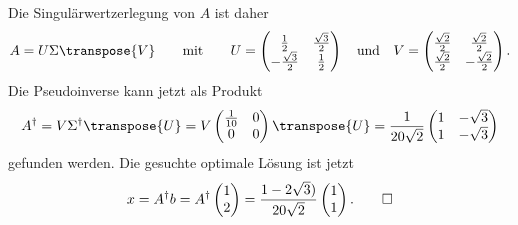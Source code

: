 \begin{loesung}
Die Singulärwertzerlegung von $A$ ist daher
\[
A
=
U\Sigma \transpose{V}
\qquad\text{mit}\qquad
U
=
\begin{pmatrix}
\frac{1}{2}         & \frac{\sqrt{3}}{2} \\
-\frac{\sqrt{3}}{2} & \frac{1}{2}       
\end{pmatrix}
\quad \text{und}\quad
V
=
\begin{pmatrix}
\frac{\sqrt{2}}2 & \frac{\sqrt{2}}2 \\
\frac{\sqrt{2}}2 &-\frac{\sqrt{2}}2
\end{pmatrix}.
\]
Die Pseudoinverse kann jetzt als Produkt
\[
A^\dagger
=
V\Sigma^\dagger \transpose{U}
=
V\begin{pmatrix}
\frac{1}{10} & 0 \\
      0      & 0
\end{pmatrix} \transpose{U}
=
\frac{1}{20\sqrt{2}}
\begin{pmatrix}
1&-\sqrt{3}\\
1&-\sqrt{3}
\end{pmatrix}
\]
gefunden werden.
Die gesuchte optimale Lösung  ist jetzt
\[
x
=
A^\dagger b
=
A^\dagger \begin{pmatrix}1\\2\end{pmatrix}
=
\frac{1-2\sqrt{3})}{20\sqrt{2}}
\begin{pmatrix}
1\\1
\end{pmatrix}.
\qedhere
\]
\end{loesung}


